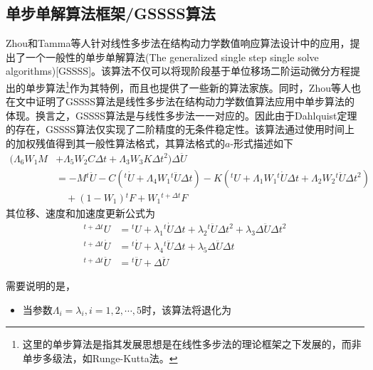 \subsection{单步单解算法框架/GSSSS算法}
Zhou和Tamma等人针对线性多步法在结构动力学数值响应算法设计中的应用，提出了一个一般性的单步单解算法\cite{Zhou2004f}(The generalized single step single solve algorithms)[GSSSS]。该算法不仅可以将现阶段基于单位移场二阶运动微分方程提出的单步算法\footnote{这里的单步算法是指其发展思想是在线性多步法的理论框架之下发展的，而非单步多级法，如Runge-Kutta法。}作为其特例，而且也提供了一些新的算法家族。同时，Zhou等人也在文中证明了GSSSS算法是线性多步法在结构动力学数值算法应用中单步算法的体现。换言之，GSSSS算法是与线性多步法一一对应的。因此由于Dahlquist定理\cite{Dahlquist1963a}的存在，GSSSS算法仅实现了二阶精度的无条件稳定性。该算法通过使用时间上的加权残值得到其一般性算法格式，其算法格式的$a$-形式描述如下
\begin{equation}
\begin{aligned}
(\Lambda_6W_1M&+\Lambda_5W_2C\Delta t+\Lambda_3W_3K\Delta t^2)\Delta\ddot{U}\\
&=-M{^t\!\ddot{U}}-C({^t\!\dot{U}}+\Lambda_4W_1{^t\!\ddot{U}}\Delta t)-K({^t\!U}+\Lambda_1W_1{^t\!\dot{U}\Delta t+\Lambda_2W_2{^t\!\ddot{U}}}\Delta t^2)\\
&\quad+(1-W_1){^t\!F}+W_1{^{t+\Delta t}\!F}
\end{aligned}
\end{equation}
其位移、速度和加速度更新公式为
\begin{subequations}
\begin{align}
{^{t+\Delta t}\!U}&={^t\!U}+\lambda_1{^t\!\dot{U}}\Delta t+\lambda_2{^t\!\ddot{U}}\Delta t^2+\lambda_3\Delta\ddot{U}\Delta t^2\\
{^{t+\Delta t}\!\dot{U}}&={^t\!\dot{U}}+\lambda_4{^t\!\ddot{U}}\Delta t+\lambda_5\Delta \ddot{U}\Delta t\\
{^{t+\Delta t}\!\ddot{U}}&={^t\!\ddot{U}}+\Delta\ddot{U}
\end{align}
\end{subequations}

需要说明的是，\begin{itemize}
\item[\ddag] 当参数$\Lambda_i=\lambda_i,i=1,2,\cdots,5$时，该算法将退化为
\end{itemize}












